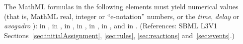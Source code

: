 The MathML formulas in the following elements must yield numerical
values (that is, MathML real, integer or ``e-notation'' numbers,
or the \emph{time}, \emph{delay} or \emph{avogadro} ):
 in \KineticLaw,  in
\InitialAssignment,  in \AssignmentRule,  in
\RateRule,  in \AlgebraicRule,  in \Event
\Delay, and  in \EventAssignment.  (References: SBML L3V1 
Sections~\ref{sec:initialAssignment}, \ref{sec:rules}, 
\ref{sec:reactions} and~\ref{sec:events}.)


